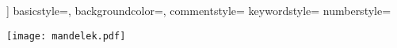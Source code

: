 \documentclass{article}
\begin{document}
]
    basicstyle=\ttfamily,
    backgroundcolor=\color{bgcolor},
    commentstyle=\color{green}
    keywordstyle=\color{magenta}
    numberstyle=\tiny\color{blue}
    
    
    \texttt{[image: mandelek.pdf]}
\end{document}
